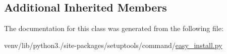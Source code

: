 \subsection*{Additional Inherited Members}


The documentation for this class was generated from the following file\+:\begin{DoxyCompactItemize}
\item 
venv/lib/python3./site-\/packages/setuptools/command/\hyperlink{easy__install_8py}{easy\+\_\+install.\+py}\end{DoxyCompactItemize}
